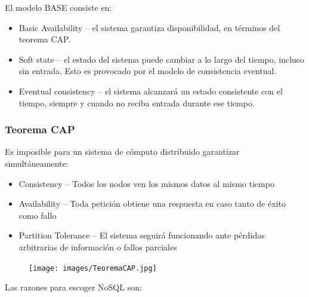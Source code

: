 \documentclass[]{book}
\providecommand{\tightlist}{%
  \setlength{\itemsep}{0pt}\setlength{\parskip}{0pt}}
\begin{document}
El modelo BASE consiste en:

\begin{itemize}
\tightlist
\item
  Basic Availability -- el sistema garantiza disponibilidad, en términos
  del teorema CAP.
\item
  Soft state -- el estado del sistema puede cambiar a lo largo del
  tiempo, incluso sin entrada. Esto es provocado por el modelo de
  consistencia eventual.
\item
  Eventual consistency -- el sistema alcanzará un estado consistente con
  el tiempo, siempre y cuando no reciba entrada durante ese tiempo.
\end{itemize}

\subsubsection{Teorema CAP}\label{teorema-cap}

Es imposible para un sistema de cómputo distribuido garantizar
simultáneamente:

\begin{itemize}
\tightlist
\item
  Consistency -- Todos los nodos ven los mismos datos al mismo tiempo
\item
  Availability -- Toda petición obtiene una respuesta en caso tanto de
  éxito como fallo
\item
  Partition Tolerance -- El sistema seguirá funcionando ante pérdidas
  arbitrarias de información o fallos parciales
\end{itemize}

\begin{figure}
\centering
\texttt{[image: images/TeoremaCAP.jpg]}
\caption{}
\end{figure}

Las razones para escoger NoSQL son:
\end{document}
